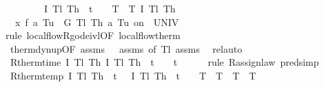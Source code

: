 \documentclass[envcountsame,envcountsect]{llncs}
\begin{document}
\begin{example}
\begin{isabellebody}
\ \ \ {\isachardoublequoteopen}\isactrlbold {\isacharbrackleft}{\isasymnot}\ {\isasymtheta}\ {\isacharequal}\ {}\ {\isasymand}\ I\ T\isactrlsub l\ T\isactrlsub h\ {\isasymand}\ t\ {\isacharequal}\ {}\ {\isasymand}\ T\ {\isacharequal}\ T{\isacharcomma}\ I\ T\isactrlsub l\ T\isactrlsub h\isactrlbold {\isacharbrackright}\ {\isasymge}\isanewline
\ \ {\isacharparenleft}x{\isasymacute}{\isacharequal}\ f\ a\ T\isactrlsub u\ {\isacharampersand}\ G\ T\isactrlsub l\ T\isactrlsub h\ a\ T\isactrlsub u\ on\ {\isacharbraceleft}{}{\isachardot}{\isachardot}{\isasymtau}{\isacharbraceright}\ UNIV\ {\isacharat}\ {}{\isacharparenright}{\isachardoublequoteclose}\isanewline
\ \ \isamarkupfalse%
{\isacharparenleft}rule\ local{\isacharunderscore}flow{\isachardot}R{\isacharunderscore}g{\isacharunderscore}ode{\isacharunderscore}ivl{\isacharbrackleft}OF\ local{\isacharunderscore}flow{\isacharunderscore}therm{\isacharbrackright}{\isacharparenright}\isanewline
\ \ \isamarkupfalse%
\ therm{\isacharunderscore}dyn{\isacharunderscore}up{\isacharbrackleft}OF\ assms{\isacharparenleft}{}{\isacharparenright}\ {\isacharunderscore}\ {\isacharunderscore}\ assms{\isacharparenleft}{}{\isacharparenright}{\isacharcomma}\ of\ T\isactrlsub l{\isacharbrackright}\ assms\ \isamarkupfalse%
\ rel{\isacharunderscore}auto{\isacharprime}%
\isanewline
\isanewline
{}\isamarkupfalse%
\ R{\isacharunderscore}therm{\isacharunderscore}time{\isacharcolon}\ {\isachardoublequoteopen}\isactrlbold {\isacharbrackleft}I\ T\isactrlsub l\ T\isactrlsub h{\isacharcomma}\ I\ T\isactrlsub l\ T\isactrlsub h\ {\isasymand}\ t\ {\isacharequal}\ {}\isactrlbold {\isacharbrackright}\ {\isasymge}\ {\isacharparenleft}t\ {\isacharcolon}{\isacharcolon}{\isacharequal}\ {}{\isacharparenright}{\isachardoublequoteclose}\isanewline
\ \ \isamarkupfalse%
\ {\isacharparenleft}rule\ R{\isacharunderscore}assign{\isacharunderscore}law{\isacharcomma}\ pred{\isacharunderscore}simp{\isacharparenright}%
\isanewline
\isanewline
{}\isamarkupfalse%
\ R{\isacharunderscore}therm{\isacharunderscore}temp{\isacharcolon}\ {\isachardoublequoteopen}\isactrlbold {\isacharbrackleft}I\ T\isactrlsub l\ T\isactrlsub h\ {\isasymand}\ t\ {\isacharequal}\ {}{\isacharcomma}\ I\ T\isactrlsub l\ T\isactrlsub h\ {\isasymand}\ t\ {\isacharequal}\ {}\ {\isasymand}\ T\ {\isacharequal}\ T\isactrlbold {\isacharbrackright}\ {\isasymge}\ {\isacharparenleft}T\ {\isacharcolon}{\isacharcolon}{\isacharequal}\ T{\isacharparenright}{\isachardoublequoteclose}\isanewline

\end{isabellebody}
\end{example}
\end{document}
